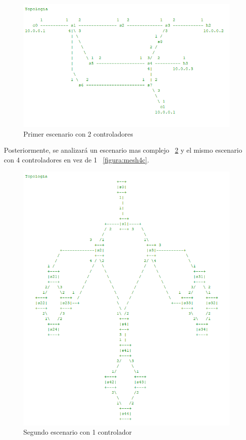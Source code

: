 \documentclass[a4paper, 12pt]{book}
\begin{document}
	\begin{figure}
		\centering
		\includegraphics[width=16cm, keepaspectratio]{img/2controllers}
		\caption{Primer escenario con 2 controladores}
		\label{figura:2controllers}
	\end{figure}
	
	Posteriormente, se analizará un escenario mas complejo ~\ref{figura:mesh} y el mismo escenario con 4 controladores en vez de 1 ~\ref{figura:mesh4c}.
	
	\begin{figure}
		\centering
		\includegraphics[width=16cm, keepaspectratio]{img/mesh}
		\caption{Segundo escenario con 1 controlador}
		\label{figura:mesh}
	\end{figure}
	
\end{document}
